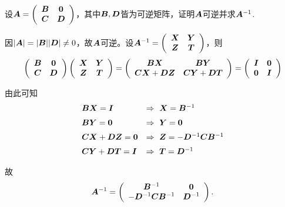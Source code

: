\begin{li}
  设$\A=\left(
    \begin{array}{cc}
      \B&\zero\\
      \C&\D
    \end{array}
  \right)$，其中$\B,\D$皆为可逆矩阵，证明$\A$可逆并求$\A^{-1}$.
\end{li}

\begin{jie}
  因$|\A|=|\B||\D|\ne 0$，故$\A$可逆。设$\A^{-1}=\left(
    \begin{array}{cc}
      \X&\Y\\
      \Z&\T
    \end{array}
  \right)$，则
  $$
  \left(
    \begin{array}{cc}
      \B&\zero\\
      \C&\D
    \end{array}
  \right) \left(
    \begin{array}{cc}
      \X&\Y\\
      \Z&\T
    \end{array}
  \right)=\left(
    \begin{array}{cc}
      \B\X&\B\Y\\
      \C\X+\D\Z&\C\Y+\D\T
    \end{array}
  \right) = \left(
    \begin{array}{cc}
      \II & \zero\\
      \zero & \II
    \end{array}
  \right)
  $$

  由此可知
  $$
  \begin{array}{ll}
    \B\X = \II   & \Rightarrow ~ \X = \B^{-1}\\[0.2cm]
    \B\Y = \zero & \Rightarrow ~ \Y = \zero\\[0.2cm]
    \C\X+\D\Z = \zero & \Rightarrow ~ \Z = -\D^{-1}\C\B^{-1}\\[0.2cm]
    \C\Y+\D\T = \II & \Rightarrow ~ \T = \D^{-1}
  \end{array}
  $$

  故
  $$
  \A^{-1} = \left(
    \begin{array}{cc}
      \B^{-1} & \zero\\
      -\D^{-1}\C\B^{-1} & \D^{-1}
    \end{array}
  \right).
  $$
\end{jie}





